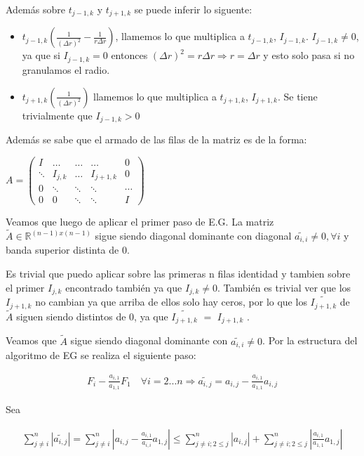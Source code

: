 \documentclass[12pt,a4paper]{article}
\begin{document}
Además sobre $t_{j-1,k}$ y $t_{j+1,k}$ se puede inferir lo siguente:
\begin{itemize}
\item $t_{j-1,k}(\frac{1}{(\Delta r)^2} - \frac{1}{r\Delta r})$, llamemos lo que multiplica a  $t_{j-1,k}$, $I_{j-1,k}$. $I_{j-1,k} \neq 0$, ya que si $I_{j-1,k} = 0$ entonces $(\Delta r)^2 = r \Delta r \Rightarrow r = \Delta r$ y esto solo pasa si no granulamos el radio.

\item $t_{j+1,k}(\frac{1}{(\Delta r)^2})$ llamemos lo que multiplica a  $t_{j+1,k}$, $I_{j+1,k}$. Se tiene trivialmente que $I_{j-1,k} > 0$
\end{itemize}

Además se sabe que el armado de las filas de la matriz es de la forma:

$
A = 
 \begin{pmatrix}
  I & \ldots & \ldots & \ldots & 0 \\
  \ddots & I_{j,k} & \ldots & I_{j+1,k} & 0 \\
  0 & \ddots & \ddots & \ddots & \cdots \\
  0 & 0 & \ddots & \ddots & I
 \end{pmatrix}
$

Veamos que luego de aplicar el primer paso de E.G. La matriz $\widetilde{A} \in {\mathds{R}}^{(n-1)x(n-1)}$ sigue siendo diagonal dominante con diagonal $\widetilde{a_{i,i}} \neq 0 ,\forall i$ y banda superior distinta de 0.

Es trivial que puedo aplicar sobre las primeras n filas identidad y tambien sobre el primer $I_{j,k}$ encontrado también ya que $I_{j,k} \neq 0$. También es trivial ver que los $I_{j+1,k}$ no cambian ya que arriba de ellos solo hay ceros, por lo que los $\widetilde{I_{j+1,k}}$ de $\widetilde{A}$ siguen siendo distintos de 0, ya que $\widetilde{I_{j+1,k}}$ $=$ ${I_{j+1,k}}$ .

Veamos que $\widetilde{A}$ sigue siendo diagonal dominante con $\widetilde{a_{i,i}} \neq 0$. Por la estructura del algoritmo de EG se realiza el siguiente paso:

\begin{align}
F_i - \frac{a_{i,1}}{a_{1,1}} F_1 \quad \forall i = 2 ... n \Rightarrow \widetilde{a_{i,j}} = a_{i,j} - \frac{a_{i,1}}{a_{1,1}} a_{i,j}
\end{align}

Sea

\begin{align*}
\sum ^{n}_{j \neq i} \left| \widetilde{a_{i,j}} \right| = \sum ^{n}_{j \neq i} \left| a_{i,j} - \frac{a_{i,1}}{a_{i,i}} a_{1,j} \right| \leq \sum ^{n}_{j\neq i; 2\leq j} \left| a_{i,j} \right| + \sum ^{n}_{j\neq i; 2\leq j} \left| \frac{a_{i,1}}{a_{1,1}} a_{1,j} \right|
\end{align*}
\end{document}
